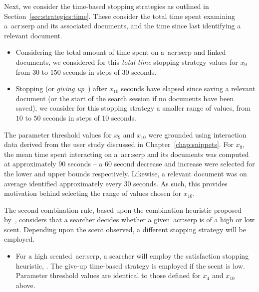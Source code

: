 Next, we consider the time-based stopping strategies as outlined in Section~\ref{sec:strategies:time}. These consider the total time spent examining a~\gls{acr:serp} and its associated documents, and the time since last identifying a relevant document.

\begin{itemize}
    \item{ Considering the total amount of time spent on a~\gls{acr:serp} and linked documents, we considered for this \emph{total time} stopping strategy values for $x_9$ from $30$ to $150$ seconds in steps of $30$ seconds.}
    
    \item{ Stopping (or \emph{giving up}~\citep{krebs1974leave_after_rule}) after $x_{10}$ seconds have elapsed since saving a relevant document (or the start of the search session if no documents have been saved), we consider for this stopping strategy a smaller range of values, from $10$ to $50$ seconds in steps of $10$ seconds.}
\end{itemize}

The parameter threshold values for $x_9$ and $x_{10}$ were grounded using interaction data derived from the user study discussed in Chapter~\ref{chap:snippets}. For $x_9$, the mean time spent interacting on a~\gls{acr:serp} and its documents was computed at approximately $90$ seconds -- a $60$ second decrease and increase were selected for the lower and upper bounds respectively. Likewise, a relevant document was on average identified approximately every $30$ seconds. As such, this provides motivation behind selecting the range of values chosen for $x_{10}$.

The second combination rule, based upon the combination heuristic proposed by~\cite{mcnair1982gut_mvt}, considers that a searcher decides whether a given~\gls{acr:serp} is of a high or low scent. Depending upon the scent observed, a different stopping strategy will be employed.

\begin{itemize}
    \item{ For a high scented~\gls{acr:serp}, a searcher will employ the satisfaction stopping heuristic, . The give-up time-based strategy  is employed if the scent is low. Parameter threshold values are identical to those defined for $x_4$ and $x_{10}$ above.}
\end{itemize}

